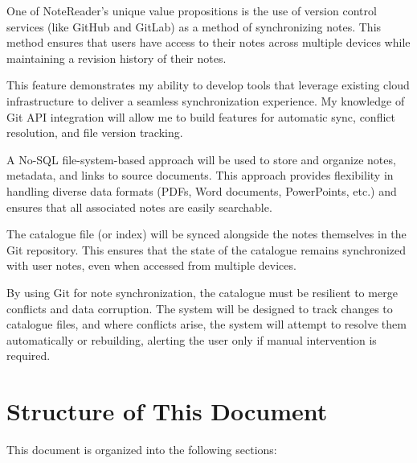 One of NoteReader's unique value propositions is the use of version control services (like GitHub and GitLab) as a method of synchronizing notes. This method ensures that users have access to their notes across multiple devices while maintaining a revision history of their notes.

This feature demonstrates my ability to develop tools that leverage existing cloud infrastructure to deliver a seamless synchronization experience. My knowledge of Git API integration will allow me to build features for automatic sync, conflict resolution, and file version tracking.

A No-SQL file-system-based approach will be used to store and organize notes, metadata, and links to source documents. This approach provides flexibility in handling diverse data formats (PDFs, Word documents, PowerPoints, etc.) and ensures that all associated notes are easily searchable.

The catalogue file (or index) will be synced alongside the notes themselves in the Git repository. This ensures that the state of the catalogue remains synchronized with user notes, even when accessed from multiple devices.

By using Git for note synchronization, the catalogue must be resilient to merge conflicts and data corruption. The system will be designed to track changes to catalogue files, and where conflicts arise, the system will attempt to resolve them automatically or rebuilding, alerting the user only if manual intervention is required.

\section{Structure of This Document}

This document is organized into the following sections:

